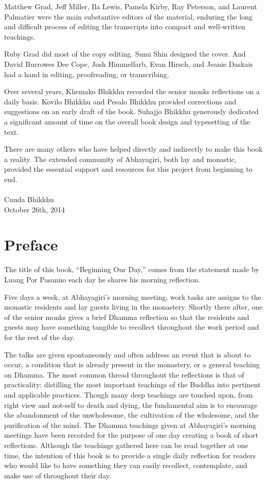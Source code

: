\documentclass[11pt,openany]{memoir}
\begin{document}
Matthew Grad, Jeff Miller, Ila Lewis, Pamela Kirby, Ray Peterson, and
Laurent Palmatier were the main substantive editors of the material,
enduring the long and difficult process of editing the transcripts into
compact and well-written teachings.

Ruby Grad did most of the copy editing. Sumi Shin designed the cover.
And David Burrowes Dee Cope, Josh Himmelfarb, Evan Hirsch, and Jeanie
Daskais had a hand in editing, proofreading, or transcribing.

Over several years, Khemako Bhikkhu recorded the senior monks
reflections on a daily basis. Kovilo Bhikkhu and Pesalo Bhikkhu provided
corrections and suggestions on an early draft of the book. Suhajjo
Bhikkhu generously dedicated a significant amount of time on the overall
book design and typesetting of the text.

There are many others who have helped directly and indirectly to make
this book a reality. The extended community of Abhayagiri, both lay and
monastic, provided the essential support and resources for this project
from beginning to end.\\
\mbox{}\\
\noindent Cunda Bhikkhu\\
October 26th, 2014\nowidow[5]

\pagestyle{plain}
\chapter{Preface}

The title of this book, ``Beginning Our Day,'' comes from the statement
made by Luang Por Pasanno each day he shares his morning reflection. 

Five days a week, at Abhayagiri's morning meeting, work tasks are
assigns to the monastic residents and lay guests living in the
monastery. Shortly there after, one of the senior monks gives a brief
Dhamma reflection so that the residents and guests may have something
tangible to recollect throughout the work period and for the rest of the
day. 

The talks are given spontaneously and often address an event that is
about to occur, a condition that is already present in the monastery, or
a general teaching on Dhamma. The most common thread throughout the
reflections is that of practicality: distilling the most important
teachings of the Buddha into pertinent and applicable practices. Though
many deep teachings are touched upon, from right view and not-self to
death and dying, the fundamental aim is to encourage the abandonment of
the unwholesome, the cultivation of the wholesome, and the purification
of the mind.
The Dhamma teachings given at Abhayagiri's morning meetings have been
recorded for the purpose of one day creating a book of short
reflections. Although the teachings gathered here can be read together
at one time, the intention of this book is to provide a single daily
reflection for readers who would like to have something they can easily
recollect, contemplate, and make use of throughout their day. 
\end{document}
